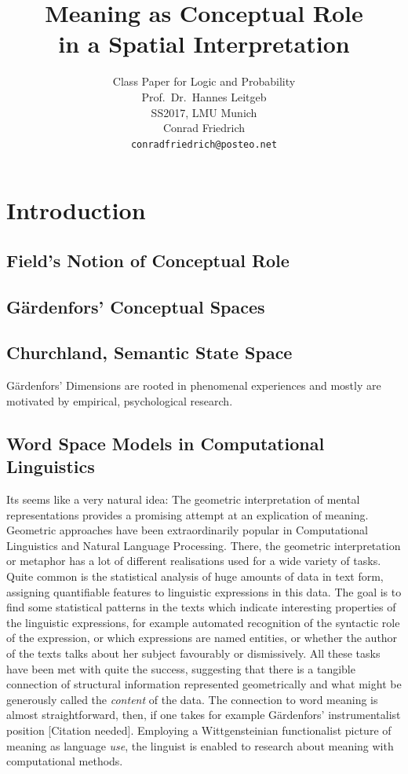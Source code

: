 \documentclass[11pt, a4paper]{scrartcl}
\title{\osfamily\textbf{Meaning as Conceptual Role}\\ in a Spatial Interpretation}
\author{Class Paper for Logic and Probability \\ Prof.\ Dr.\ Hannes Leitgeb \\ SS2017, LMU Munich \\ Conrad Friedrich \\ \texttt{conradfriedrich@posteo.net}}
\renewcommand{\i}[1]{\emph{#1}}
\begin{document}
\maketitle
{}
\thispagestyle{empty}
\newpage
\tableofcontents
\newpage
\section{Introduction}

\subsection{Field's Notion of Conceptual Role}
\subsection{Gärdenfors' Conceptual Spaces}
\subsection{Churchland, Semantic State Space}
Gärdenfors' Dimensions are rooted in phenomenal experiences and mostly are motivated by empirical, psychological research.
\subsection{Word Space Models in Computational Linguistics}
Its seems like a very natural idea: The geometric interpretation of mental representations provides a promising attempt at an explication of meaning. Geometric approaches have been extraordinarily popular in Computational Linguistics and Natural Language Processing. There, the geometric interpretation or metaphor has a lot of different realisations used for a wide variety of tasks. Quite common is the statistical analysis of huge amounts of data in text form, assigning quantifiable features to linguistic expressions in this data. The goal is to find some statistical patterns in the texts which indicate interesting properties of the linguistic expressions, for example automated recognition of the syntactic role of the expression, or which expressions are named entities, or whether the author of the texts talks about her subject favourably or dismissively. All these tasks have been met with quite the success, suggesting that there is a tangible connection of structural information represented geometrically and what might be generously called the \i{content} of the data. The connection to word meaning is almost straightforward, then, if one takes for example Gärdenfors' instrumentalist position [Citation needed]. Employing a Wittgensteinian functionalist picture of meaning as language \i{use}, the linguist is enabled to research about meaning with computational methods.
\end{document}

